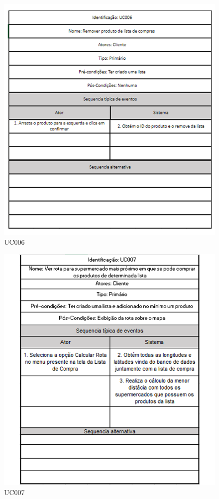 \begin{figure}[H]
	\centering
		\caption{UC006}
		\includegraphics[scale=0.8]{Imagens/UC006.PNG}
\end{figure}

\begin{figure}[H]
	\centering
		\caption{UC007}
		\includegraphics[scale=0.8]{Imagens/UC007.PNG}
\end{figure}
	
